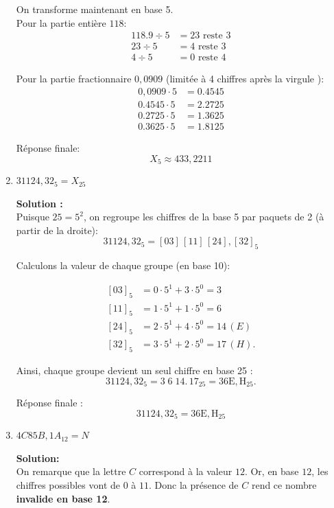 \documentclass{article}
\begin{document}
\begin{enumerate}[label=\alph*), itemsep=2em]
    On transforme maintenant en base 5. \\
    Pour la partie entière $118$:
    \[
    \begin{aligned}
    118.9 \div 5 &= 23 \text{ reste } 3 \\
    23 \div 5 &= 4 \text{ reste } 3 \\
    4 \div 5 &= 0 \text{ reste } 4
    \end{aligned}
    \]

    Pour la partie fractionnaire $0,0909$ (limitée à 4 chiffres après la virgule ):
    \[
    \begin{aligned}
    0,0909 \cdot 5 &= 0.4545 \\
    0.4545 \cdot 5 &= 2.2725 \\
    0.2725 \cdot 5 &= 1.3625 \\
    0.3625 \cdot 5 &= 1.8125
    \end{aligned}
    \]

    Réponse finale:
    \[
    X_{5} \approx 433,{2211}
    \]
    
    \item $31124,32_{5} = X_{25}$

    \textbf{Solution :}\\
    Puisque $25 = 5^2$, on regroupe les chiffres de la base 5 par paquets de 2 (à partir de la droite):
    \[
    31124,32_{5} = [03]\,[11]\,[24],[32]_{5}
    \]

    Calculons la valeur de chaque groupe (en base 10):

    \[
    \begin{aligned}
    [03]_5 &= 0\cdot5^1 + 3\cdot5^0 = 3\\
    [11]_5 &= 1\cdot5^1 + 1\cdot5^0 = 6\\
    [24]_5 &= 2\cdot5^1 + 4\cdot5^0 = 14 \, (E)\\
    [32]_5 &= 3\cdot5^1 + 2\cdot5^0 = 17 \, (H).
    \end{aligned}
    \]

    Ainsi, chaque groupe devient un seul chiffre en base 25 :
    \[
    31124,32_{5} = 3\;6\;14 .\,17_{25} = 36\mathrm{E},\mathrm{H}_{25}.
    \]

    Réponse finale :
    \[
    31124,32_{5} = 36\mathrm{E},\mathrm{H}_{25}
    \]


    \item $4C85B,1A_{12} = N$

    \textbf{Solution:} \\
    On remarque que la lettre $C$ correspond à la valeur $12$.  
    Or, en base $12$, les chiffres possibles vont de $0$ à $11$.  
    Donc la présence de $C$ rend ce nombre \textbf{invalide en base 12}. 


\end{enumerate}
\end{document}
